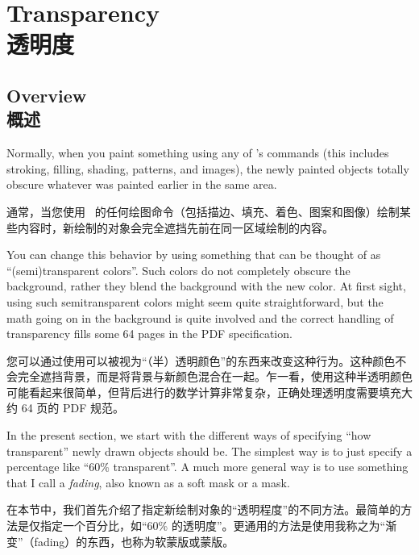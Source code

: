 \setcounter{section}{22}
\setcounter{subsection}{8}
\setcounter{subsubsection}{0}
%
%
%


\section{Transparency\\透明度}
\label{section-tikz-transparency}

\subsection{Overview\\概述}

Normally, when you paint something using any of \tikzname's commands (this
includes stroking, filling, shading, patterns, and images), the newly painted
objects totally obscure whatever was painted earlier in the same area.

通常，当您使用 \tikzname\ 的任何绘图命令（包括描边、填充、着色、图案和图像）绘制某些内容时，新绘制的对象会完全遮挡先前在同一区域绘制的内容。

You can change this behavior by using something that can be thought of as
``(semi)transparent colors''. Such colors do not completely obscure the
background, rather they blend the background with the new color. At first
sight, using such semitransparent colors might seem quite straightforward, but
the math going on in the background is quite involved and the correct handling
of transparency fills some 64 pages in the PDF specification.

您可以通过使用可以被视为“（半）透明颜色”的东西来改变这种行为。这种颜色不会完全遮挡背景，而是将背景与新颜色混合在一起。乍一看，使用这种半透明颜色可能看起来很简单，但背后进行的数学计算非常复杂，正确处理透明度需要填充大约 64 页的 PDF 规范。

In the present section, we start with the different ways of specifying ``how
transparent'' newly drawn objects should be. The simplest way is to just
specify a percentage like ``60\% transparent''. A much more general way is to
use something that I call a \emph{fading}, also known as a soft mask or a mask.

在本节中，我们首先介绍了指定新绘制对象的“透明程度”的不同方法。最简单的方法是仅指定一个百分比，如“60\% 的透明度”。更通用的方法是使用我称之为“渐变”（fading）的东西，也称为软蒙版或蒙版。

